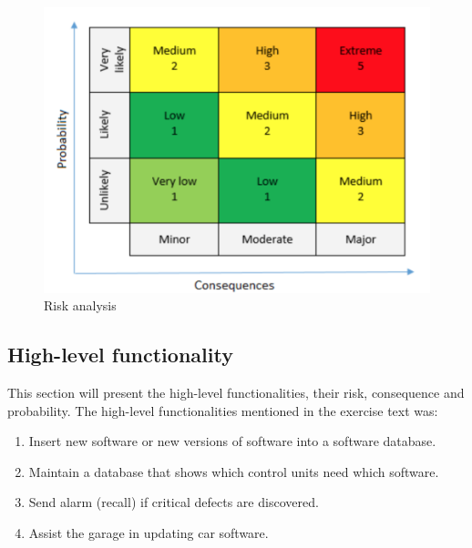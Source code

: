 \begin{figure}[H]
    \centering
    \includegraphics[scale=0.4]{images/risk_analysis}
    \caption{Risk analysis}
    \label{fig:risk_analysis}
\end{figure}

\subsection{High-level functionality}

This section will present the high-level functionalities, their risk, consequence and probability. The high-level functionalities mentioned in the exercise text was:

\begin{enumerate}
    \item Insert new software or new versions of software into a software database.
    \item Maintain a database that shows which control units need which software.
    \item Send alarm (recall) if critical defects are discovered.
    \item Assist the garage in updating car software.
\end{enumerate}

